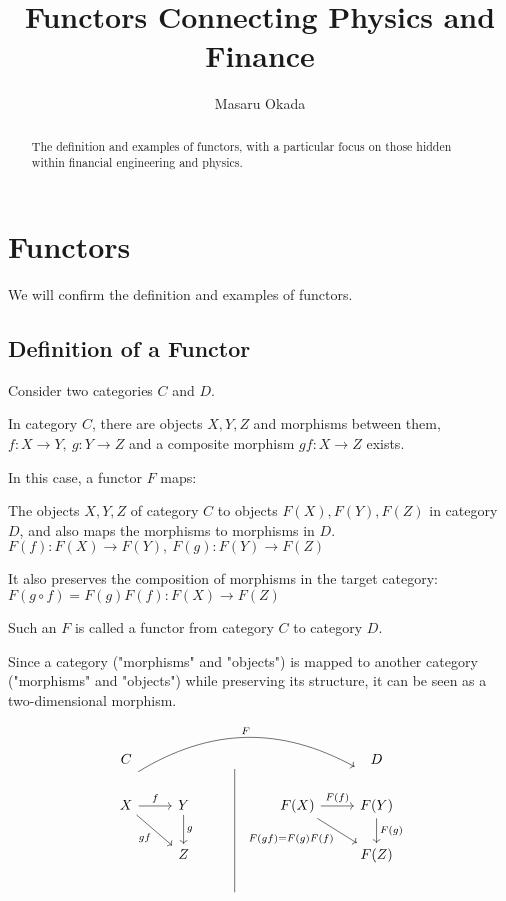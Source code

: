 \documentclass[uplatex,a4j,12pt,dvipdfmx]{jsarticle}
\title{
Functors Connecting Physics and Finance
}
\author{
Masaru Okada
}
\begin{document}
\maketitle

\begin{abstract}
	The definition and examples of functors, with a particular focus on those hidden within financial engineering and physics.
\end{abstract}


\section{Functors}

We will confirm the definition and examples of functors.

\subsection{Definition of a Functor}

Consider two categories $C$ and $D$.

In category $C$, there are objects $X,Y,Z$ and morphisms between them,
$f: X \to Y , \ g: Y \to Z$
and a composite morphism
$gf: X \to Z$
exists.

In this case, a functor $F$ maps:

The objects $X,Y,Z$ of category $C$ to objects $F(X),F(Y),F(Z)$ in category $D$,
and also maps the morphisms to morphisms in $D$.
$F(f): F(X) \to F(Y) , \ F(g): F(Y) \to F(Z)$

It also preserves the composition of morphisms in the target category:
$F(g \circ f) = F(g) F(f): F(X) \to F(Z)$

Such an $F$ is called a functor from category $C$ to category $D$.

Since a category ("morphisms" and "objects") is mapped to another category ("morphisms" and "objects") while preserving its structure, it can be seen as a two-dimensional morphism.

\[
	\begin{tikzcd}
		C           &        & {}          &                  & D            \\
		X \arrow[r, "f"] \arrow[rd, "gf"'] \arrow[rrrr, "F", bend left, shift left=8] & Y \arrow[d, "g"] &         & F(X) \arrow[r, "F(f)"] \arrow[rd, "F(gf) = F(g)F(f)"'] & F(Y) \arrow[d, "F(g)"] \\
		& Z          &         &                                  & F(Z)         \\
		&            & {} \arrow[uuu, no head] &                                  &
	\end{tikzcd}
\]
\end{document}
